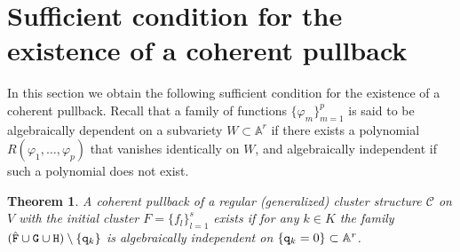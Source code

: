 \documentclass{amsart}
\newtheorem{theorem}{Theorem}
\theoremstyle{definition}
\theoremstyle{remark}
\numberwithin{equation}{section}
\numberwithin{theorem}{section}
\def\AA{{\mathbb A}}
\def\CC{{\mathcal C}}
\def\ttq{{\tt q}}
\def\ttF{{\tt F}}
\def\ttG{{\tt G}}
\def\ttH{{\tt H}}
\begin{document}
\section{Sufficient condition for the existence of a coherent pullback}\label{maincond}

In this section we obtain the following sufficient condition for the existence of a coherent pullback. Recall that 
a family of functions $\{\varphi_m\}_{m=1}^p$ is said to be algebraically dependent on a subvariety $W\subset \AA^r$ if there exists a polynomial $R(\varphi_1,\dots,\varphi_p)$ that vanishes identically on $W$, and algebraically independent if such a polynomial does not exist.

\begin{theorem}\label{maincondtheo}
A coherent pullback of a regular (generalized) cluster structure $\CC$ on $V$ with the initial cluster 
$F=\{f_l\}_{l=1}^s$ exists if for any $k\in K$ 
the family $(\hat\ttF\cup\ttG\cup\ttH)\setminus\{\ttq_{k}\}$
is algebraically independent on $\{\ttq_{k}=0\}\subset\AA^r$. 
\end{theorem}
\end{document}
